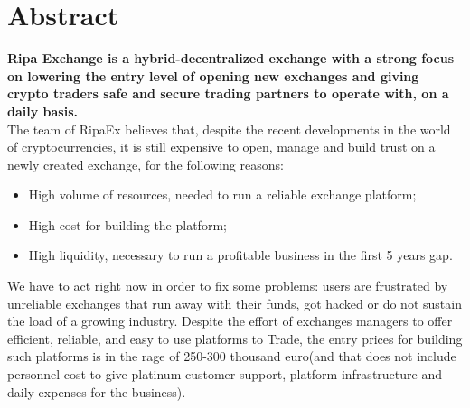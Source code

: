 \documentclass[11pt,fleqn,oneside]{book} %
\begin{document}
\begingroup
\thispagestyle{empty}
\endgroup

\pagestyle{empty} %
\usechapterimagefalse %
\chapter{Abstract}
\textbf{Ripa Exchange is a hybrid-decentralized exchange with a strong focus on lowering the entry
level of opening new exchanges and giving crypto traders safe and secure trading partners to operate with, on a daily basis.}\\

The team of RipaEx believes that, despite the recent developments in the world of cryptocurrencies, it is still 
expensive to open, manage and build trust on a newly created exchange, for the following reasons:
\begin{itemize}
	\item High volume of resources, needed to run a reliable exchange platform;
	\item High cost for building the platform;
	\item High liquidity, necessary to run a profitable business in the first 5 years gap.
\end{itemize}

We have to act right now in order to fix some problems: users are frustrated by unreliable exchanges that run away with their funds, 
got hacked or do not sustain the load of a growing industry. Despite the effort of exchanges managers to offer efficient, reliable, 
and easy to use platforms to Trade, the entry prices for building such platforms is in the rage of 250-300 
thousand euro(and that does not include personnel cost to give platinum customer support, platform infrastructure and daily expenses 
for the business). \\
\end{document}
